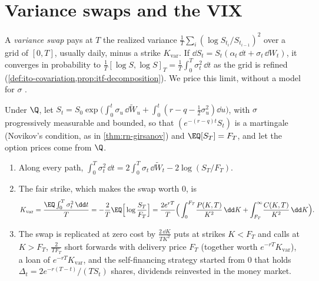 \section{Variance swaps and the VIX}\label{sec:iv-variance}

A \emph{variance swap} pays at $T$ the realized variance $\frac1T\sum_i(\log S_{t_i}/S_{t_{i-1}})^2$ over a
grid of $[0,T]$, usually daily, minus a strike $K_{\mathrm{var}}$. If $\dd S_t=S_t(\alpha_t\,\dd t+\sigma_t\,\dd W_t)$,
it converges in probability to $\frac1T[\log S,\log S]_T=\frac1T\int_0^T\sigma_t^2\,\dd t$ as the grid is
refined (\cref{def:ito-covariation,prop:itf-decomposition}). We price this limit, without a model for
$\sigma$ \citep{carr-madan,demeterfi-variance-swaps}.

\begin{proposition}\label{prop:iv-variance-swap}
Under $\Q$, let $S_t=S_0\exp\big(\int_0^t\sigma_u\,\dd\widetilde W_u+\int_0^t(r-q-\frac12\sigma_u^2)\dd u\big)$,
with $\sigma$ progressively measurable and bounded, so that $(e^{-(r-q)t}S_t)$ is a martingale (Novikov's
condition, as in \cref{thm:rn-girsanov}) and $\EQ[S_T]=F_T$, and let the option prices come from $\Q$.
\begin{enumerate}[label=(\roman*)]
  \item Along every path, $\int_0^T\sigma_t^2\,\dd t=2\int_0^T\sigma_t\,\dd\widetilde W_t-2\log(S_T/F_T)$.
  \item The fair strike, which makes the swap worth $0$, is
    \begin{equation}\label{eq:iv-kvar}
      K_{\mathrm{var}}=\frac{\EQ\int_0^T\sigma_t^2\,\dd t}{T}=-\frac2T\EQ\Big[\log\frac{S_T}{F_T}\Big]
      =\frac{2e^{rT}}T\Big(\int_0^{F_T}\!\frac{P(K,T)}{K^2}\,\dd K+\int_{F_T}^\infty\!\frac{C(K,T)}{K^2}\,\dd K\Big).
    \end{equation}
  \item The swap is replicated at zero cost by $\frac{2\,\dd K}{TK^2}$ puts at strikes $K<F_T$ and calls at
    $K>F_T$, $\frac2{TF_T}$ short forwards with delivery price $F_T$ (together worth
    $e^{-rT}K_{\mathrm{var}}$), a loan of $e^{-rT}K_{\mathrm{var}}$, and the self-financing strategy started
    from $0$ that holds $\Delta_t=2e^{-r(T-t)}/(TS_t)$ shares, dividends reinvested in the money market.
\end{enumerate}
\end{proposition}

